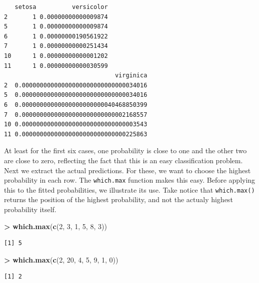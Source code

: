 \documentclass[]{krantz}
\makeatletter
\newenvironment{Shaded}{\begin{snugshade}}{\end{snugshade}}
\newcommand{\DecValTok}[1]{\textcolor[rgb]{0.06,0.06,0.06}{#1}}
\newcommand{\KeywordTok}[1]{\textcolor[rgb]{0.27,0.27,0.27}{\textbf{#1}}}
\newcommand{\NormalTok}[1]{#1}
\newcommand{\OperatorTok}[1]{\textcolor[rgb]{0.43,0.43,0.43}{\textbf{#1}}}
\newcommand{\StringTok}[1]{\textcolor[rgb]{0.5,0.5,0.5}{#1}}
\newenvironment{kframe}{%
\medskip{}
\setlength{\fboxsep}{.8em}
 \def\at@end@of@kframe{}%
 \ifinner\ifhmode%
  \def\at@end@of@kframe{\end{minipage}}%
  \begin{minipage}{\columnwidth}%
 \fi\fi%
 \def\FrameCommand##1{\hskip\@totalleftmargin \hskip-\fboxsep
 \colorbox{shadecolor}{##1}\hskip-\fboxsep
     \hskip-\linewidth \hskip-\@totalleftmargin \hskip\columnwidth}%
 \MakeFramed {\advance\hsize-\width
   \@totalleftmargin\z@ \linewidth\hsize
   \@setminipage}}%
 {\par\unskip\endMakeFramed%
 \at@end@of@kframe}
\renewenvironment{Shaded}{\begin{kframe}}{\end{kframe}}
\makeatother
\begin{document}
\begin{verbatim}
   setosa          versicolor
2       1 0.00000000000009874
5       1 0.00000000000009874
6       1 0.00000000190561922
7       1 0.00000000000251434
10      1 0.00000000000001202
11      1 0.00000000000030599
                               virginica
2  0.00000000000000000000000000000034016
5  0.00000000000000000000000000000034016
6  0.00000000000000000000000040468850399
7  0.00000000000000000000000000002168557
10 0.00000000000000000000000000000003543
11 0.00000000000000000000000000000225863
\end{verbatim}

At least for the first six cases, one probability is close to one and the other two are close to zero, reflecting the fact that this is an easy classification problem. Next we extract the actual predictions. For these, we want to choose the highest probability in each row. The \texttt{which.max} function makes this easy. Before applying this to the fitted probabilities, we illustrate its use. Take notice that \texttt{which.max()} returns the position of the highest probability, and not the actualy highest probability itself.

\begin{Shaded}
\begin{Highlighting}[]
\OperatorTok{>}\StringTok{ }\KeywordTok{which.max}\NormalTok{(}\KeywordTok{c}\NormalTok{(}\DecValTok{2}\NormalTok{, }\DecValTok{3}\NormalTok{, }\DecValTok{1}\NormalTok{, }\DecValTok{5}\NormalTok{, }\DecValTok{8}\NormalTok{, }\DecValTok{3}\NormalTok{))}
\end{Highlighting}
\end{Shaded}

\begin{verbatim}
[1] 5
\end{verbatim}

\begin{Shaded}
\begin{Highlighting}[]
\OperatorTok{>}\StringTok{ }\KeywordTok{which.max}\NormalTok{(}\KeywordTok{c}\NormalTok{(}\DecValTok{2}\NormalTok{, }\DecValTok{20}\NormalTok{, }\DecValTok{4}\NormalTok{, }\DecValTok{5}\NormalTok{, }\DecValTok{9}\NormalTok{, }\DecValTok{1}\NormalTok{, }\DecValTok{0}\NormalTok{))}
\end{Highlighting}
\end{Shaded}

\begin{verbatim}
[1] 2
\end{verbatim}
\end{document}
